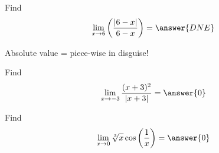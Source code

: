 \documentclass[handout]{ximera}
\begin{document}
\begin{exercise}
Find
\[
\lim_{x\to6}\left(\frac{\left|6-x\right|}{6-x}\right)
= \answer{DNE}
\]

\begin{hint}
Absolute value = piece-wise in disguise!
\end{hint}
\end{exercise}

\begin{exercise}
Find 
\[ \displaystyle\lim_{x \to -3} \frac{(x+3)^2}{|x+3|} = \answer{0} \]
\end{exercise}

\begin{exercise}
Find
\[ \displaystyle\lim_{x \to 0} \sqrt[3]{x} \cos \left(\frac{1}{x}\right) = \answer{0}\]

\end{exercise}




\end{document}
